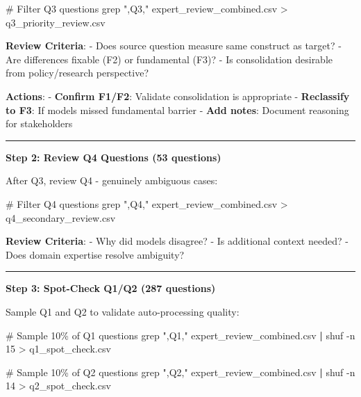 \documentclass[
  letterpaper,
]{report}
\newenvironment{Shaded}{\begin{snugshade}}{\end{snugshade}}
\newcommand{\AttributeTok}[1]{\textcolor[rgb]{0.40,0.45,0.13}{#1}}
\newcommand{\CommentTok}[1]{\textcolor[rgb]{0.37,0.37,0.37}{#1}}
\newcommand{\FunctionTok}[1]{\textcolor[rgb]{0.28,0.35,0.67}{#1}}
\newcommand{\KeywordTok}[1]{\textcolor[rgb]{0.00,0.23,0.31}{\textbf{#1}}}
\newcommand{\NormalTok}[1]{\textcolor[rgb]{0.00,0.23,0.31}{#1}}
\newcommand{\OperatorTok}[1]{\textcolor[rgb]{0.37,0.37,0.37}{#1}}
\newcommand{\StringTok}[1]{\textcolor[rgb]{0.13,0.47,0.30}{#1}}
\begin{document}
\begin{Shaded}
\begin{Highlighting}[]
\CommentTok{\# Filter Q3 questions}
\FunctionTok{grep} \StringTok{",Q3,"}\NormalTok{ expert\_review\_combined.csv }\OperatorTok{\textgreater{}}\NormalTok{ q3\_priority\_review.csv}
\end{Highlighting}
\end{Shaded}

\textbf{Review Criteria}: - Does source question measure same construct
as target? - Are differences fixable (F2) or fundamental (F3)? - Is
consolidation desirable from policy/research perspective?

\textbf{Actions}: - \textbf{Confirm F1/F2}: Validate consolidation is
appropriate - \textbf{Reclassify to F3}: If models missed fundamental
barrier - \textbf{Add notes}: Document reasoning for stakeholders

\begin{center}\rule{0.5\linewidth}{0.5pt}\end{center}

\textbf{Step 2: Review Q4 Questions (53 questions)}

After Q3, review Q4 - genuinely ambiguous cases:

\begin{Shaded}
\begin{Highlighting}[]
\CommentTok{\# Filter Q4 questions}
\FunctionTok{grep} \StringTok{",Q4,"}\NormalTok{ expert\_review\_combined.csv }\OperatorTok{\textgreater{}}\NormalTok{ q4\_secondary\_review.csv}
\end{Highlighting}
\end{Shaded}

\textbf{Review Criteria}: - Why did models disagree? - Is additional
context needed? - Does domain expertise resolve ambiguity?

\begin{center}\rule{0.5\linewidth}{0.5pt}\end{center}

\textbf{Step 3: Spot-Check Q1/Q2 (287 questions)}

Sample Q1 and Q2 to validate auto-processing quality:

\begin{Shaded}
\begin{Highlighting}[]
\CommentTok{\# Sample 10\% of Q1 questions}
\FunctionTok{grep} \StringTok{",Q1,"}\NormalTok{ expert\_review\_combined.csv }\KeywordTok{|} \FunctionTok{shuf} \AttributeTok{{-}n}\NormalTok{ 15 }\OperatorTok{\textgreater{}}\NormalTok{ q1\_spot\_check.csv}

\CommentTok{\# Sample 10\% of Q2 questions}
\FunctionTok{grep} \StringTok{",Q2,"}\NormalTok{ expert\_review\_combined.csv }\KeywordTok{|} \FunctionTok{shuf} \AttributeTok{{-}n}\NormalTok{ 14 }\OperatorTok{\textgreater{}}\NormalTok{ q2\_spot\_check.csv}
\end{Highlighting}
\end{Shaded}
\end{document}

